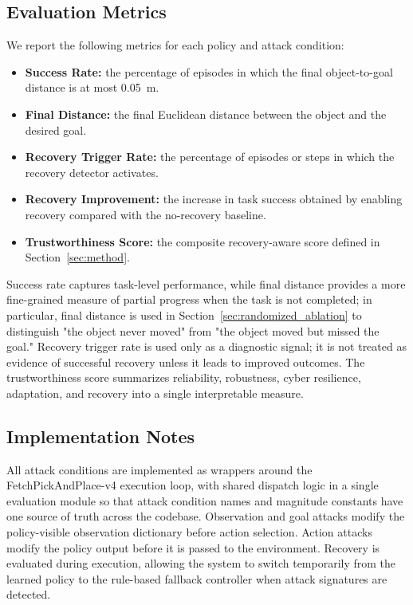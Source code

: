 \documentclass[conference]{IEEEtran}
\begin{document}
\subsection{Evaluation Metrics}

We report the following metrics for each policy and attack condition:

\begin{itemize}
    \item \textbf{Success Rate:} the percentage of episodes in which the final
    object-to-goal distance is at most 0.05~m.
    \item \textbf{Final Distance:} the final Euclidean distance between the object
    and the desired goal.
    \item \textbf{Recovery Trigger Rate:} the percentage of episodes or steps in which
    the recovery detector activates.
    \item \textbf{Recovery Improvement:} the increase in task success obtained by
    enabling recovery compared with the no-recovery baseline.
    \item \textbf{Trustworthiness Score:} the composite recovery-aware score defined
    in Section~\ref{sec:method}.
\end{itemize}

Success rate captures task-level performance, while final distance provides a more
fine-grained measure of partial progress when the task is not completed; in particular,
final distance is used in Section~\ref{sec:randomized_ablation} to distinguish "the
object never moved" from "the object moved but missed the goal." Recovery trigger rate
is used only as a diagnostic signal; it is not treated as evidence of successful
recovery unless it leads to improved outcomes. The trustworthiness score summarizes
reliability, robustness, cyber resilience, adaptation, and recovery into a single
interpretable measure.

\subsection{Implementation Notes}

All attack conditions are implemented as wrappers around the FetchPickAndPlace-v4
execution loop, with shared dispatch logic in a single evaluation module so that
attack condition names and magnitude constants have one source of truth across the
codebase. Observation and goal attacks modify the policy-visible observation
dictionary before action selection. Action attacks modify the policy output before it
is passed to the environment. Recovery is evaluated during execution, allowing the
system to switch temporarily from the learned policy to the rule-based fallback
controller when attack signatures are detected.
\end{document}
